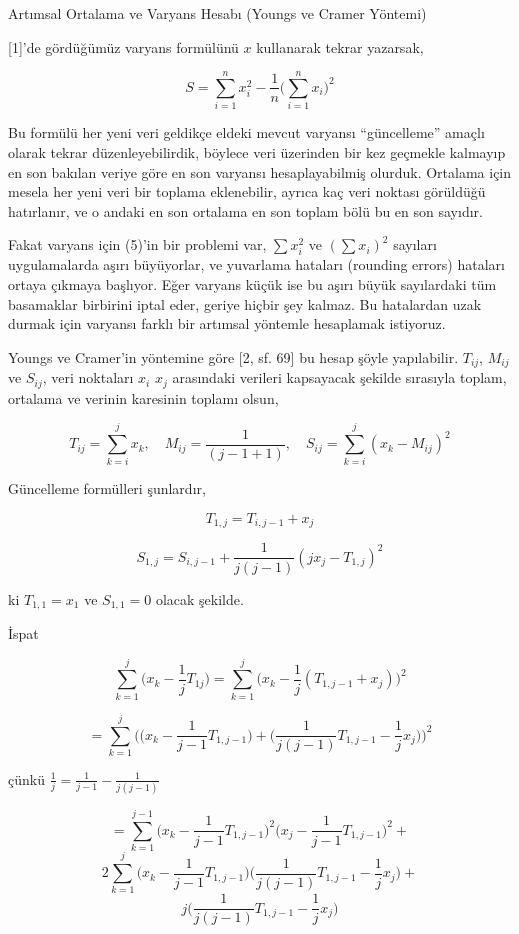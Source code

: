 \documentclass[12pt,fleqn]{article}\usepackage{../../common}
\begin{document}
Artımsal Ortalama ve Varyans Hesabı (Youngs ve Cramer Yöntemi)

[1]'de gördüğümüz varyans formülünü $x$ kullanarak tekrar yazarsak,

$$ 
S = \sum _{i=1}^{n} x_i^2 - \frac{1}{n} \bigg( \sum _{i=1}^{n} x_i \bigg)^2  
$$

Bu formülü her yeni veri geldikçe eldeki mevcut varyansı ``güncelleme''
amaçlı olarak tekrar düzenleyebilirdik, böylece veri üzerinden bir kez
geçmekle kalmayıp en son bakılan veriye göre en son varyansı
hesaplayabilmiş olurduk. Ortalama için mesela her yeni veri bir toplama
eklenebilir, ayrıca kaç veri noktası görüldüğü hatırlanır, ve o andaki en
son ortalama en son toplam bölü bu en son sayıdır. 

Fakat varyans için (5)'in bir problemi var, $\sum x_i^2$ ve $(\sum x_i)^2$
sayıları uygulamalarda aşırı büyüyorlar, ve yuvarlama hataları (rounding
errors) hataları ortaya çıkmaya başlıyor. Eğer varyans küçük ise bu aşırı
büyük sayılardaki tüm basamaklar birbirini iptal eder, geriye hiçbir şey
kalmaz. Bu hatalardan uzak durmak için varyansı farklı bir artımsal
yöntemle hesaplamak istiyoruz.

Youngs ve Cramer'in yöntemine göre [2, sf. 69] bu hesap şöyle
yapılabilir. $T_{ij}$, $M_{ij}$ ve $S_{ij}$, veri noktaları $x_i$ $x_j$
arasındaki verileri kapsayacak şekilde sırasıyla toplam, ortalama ve verinin
karesinin toplamı olsun,

$$ 
T_{ij} = \sum _{k=i}^{j} x_k , \quad  
M_{ij} = \frac{1}{(j-1+1)}, \quad
S_{ij} = \sum _{k=i}^{j} (x_k - M_{ij})^2
$$

Güncelleme formülleri şunlardır, 

$$ T_{1,j} = T_{i,j-1} + x_j$$

$$ S_{1,j} = S_{i,j-1} + \frac{1}{j(j-1)} (jx_j - T_{1,j})^2  $$

ki $T_{1,1} = x_1$ ve $S_{1,1}=0$ olacak şekilde.

İspat

$$ 
\sum _{k=1}^{j} \bigg( x_k - \frac{1}{j} T_{1j} \bigg) = 
\sum _{k=1}^{j} \bigg( x_k - \frac{1}{j} (T_{1,j-1}+x_j)  \bigg)^2
$$

$$ = \sum _{k=1}^{j} \bigg(
\bigg(x_k - \frac{1}{j-1}T_{1,j-1} \bigg) + 
\bigg( \frac{1}{j(j-1)} T_{1,j-1} - \frac{1}{j} x_j\bigg) 
\bigg)^2
$$

çünkü $\frac{1}{j} = \frac{1}{j-1}-\frac{1}{j(j-1)}$


$$
= \sum _{k=1}^{j-1} \bigg( x_k - \frac{1}{j-1} T_{1,j-1} \bigg)^2  
 \bigg( x_j - \frac{1}{j-1} T_{1,j-1} \bigg)^2 +
$$
$$
2 \sum _{k=1}^{j}  \bigg( x_k - \frac{1}{j-1} T_{1,j-1} \bigg)
\bigg( \frac{1}{j(j-1)} T_{1,j-1} - \frac{1}{j} x_j \bigg) +
$$
$$
j \bigg( \frac{1}{j(j-1)} T_{1,j-1} - \frac{1}{j} x_j \bigg) 
$$
\end{document}
